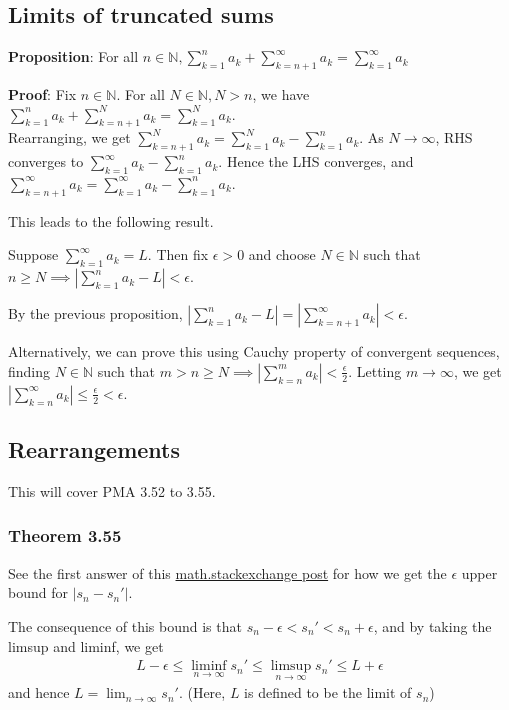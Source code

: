 \documentclass{article}
\begin{document}
\subsection{Limits of truncated sums}
\textbf{Proposition}: For all $n\in \mathbb{N}, \sum_{k=1}^na_k+\sum_{k=n+1}^\infty a_k=\sum_{k=1}^\infty a_k$

\textbf{Proof}: Fix $n\in \mathbb{N}$. For all $N\in \mathbb{N}, N>n$, we have $\sum_{k=1}^na_k+\sum_{k=n+1}^N a_k=\sum_{k=1}^N a_k$.\\
Rearranging, we get $\sum_{k=n+1}^N a_k=\sum_{k=1}^N a_k-\sum_{k=1}^na_k$. As $N\rightarrow \infty$, RHS converges to $\sum_{k=1}^\infty a_k-\sum_{k=1}^na_k$. Hence the LHS converges, and $\sum_{k=n+1}^\infty a_k=\sum_{k=1}^\infty a_k-\sum_{k=1}^na_k$.

This leads to the following result. 

Suppose $\sum_{k=1}^\infty a_k=L$. Then fix $\epsilon >0$ and choose $N\in \mathbb{N}$ such that $n\geq N\implies |\sum_{k=1}^{n}a_k - L|<\epsilon$.

By the previous proposition, $|\sum_{k=1}^{n}a_k - L|=|\sum_{k=n+1}^\infty a_k|<\epsilon$.


Alternatively, we can prove this using Cauchy property of convergent sequences, finding $N\in \mathbb{N}$ such that $m>n\geq N\implies |\sum_{k=n}^ma_k|<\frac{\epsilon}{2}$. Letting $m\rightarrow \infty$, we get $|\sum_{k=n}^\infty a_k|\leq \frac{\epsilon}{2} < \epsilon$.


\subsection{Rearrangements}
This will cover PMA 3.52 to 3.55.

\subsubsection{Theorem 3.55}
See the first answer of this \href{https://math.stackexchange.com/questions/523979/theorem-3-55-rudin-rearrangement-and-convergence}{math.stackexchange post} for how we get the $\epsilon$ upper bound for $|s_n-s_n'|$.

The consequence of this bound is that $s_n - \epsilon <s_n'<s_n + \epsilon$, and by taking the limsup and liminf, we get
\begin{align*}
	L - \epsilon \leq \liminf_{n\rightarrow \infty}s_n'\leq \limsup_{n\rightarrow \infty}s_n' \leq L + \epsilon
\end{align*}
and hence $L = \lim_{n\rightarrow \infty}s_n'$. (Here, $L$ is defined to be the limit of $s_n$)
\end{document}
